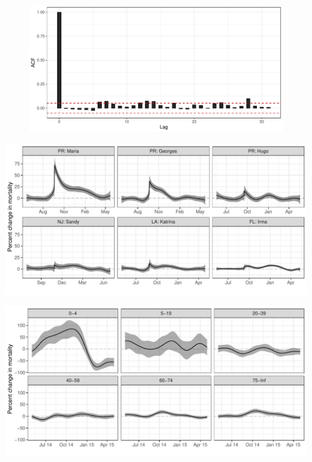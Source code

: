 \documentclass[11pt]{article}
\begin{document}
\begin{suppfigure}[ht]
\begin{subfigure}[t]{0.49\linewidth}
		\caption{} 
		\label{supp-fig:qqplot-correlated}
	\end{subfigure}
	\hfill
	\begin{subfigure}[t]{0.49\linewidth}
		\centering
		\includegraphics[width=1\linewidth]{figs//supp-figure-2d.pdf}
		\caption{} 
		\label{supp-fig:no-correlation}
	\end{subfigure}
	\caption{}
	\label{supp-fig:correlated-errors}
\end{suppfigure}

\begin{suppfigure}[ht]
	\centering
	\includegraphics[width=1\linewidth]{figs/supp-figure-3.pdf} 
	\caption{}
	\label{supp-fig:hurricane-effects}
\end{suppfigure}

\begin{suppfigure}[ht]
	\centering
	\includegraphics[width=1\linewidth]{figs/supp-figure-4.pdf} 
	\caption{}
	\label{supp-fig:chikungunya-agegroups}
\end{suppfigure}
\end{document}
